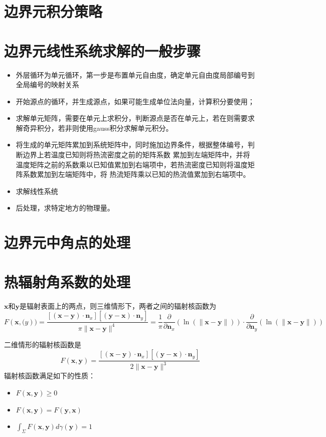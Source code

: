 \section{边界元积分策略}
\section{边界元线性系统求解的一般步骤}
\begin{itemize}
	\item 外层循环为单元循环，第一步是布置单元自由度，确定单元自由度局部编号到全局编号的映射关系
	\item 开始源点的循环，并生成源点，如果可能生成单位法向量，计算积分要使用；
	\item 求解单元矩阵，需要在单元上求积分，判断源点是否在单元上，若在则需要求解奇异积分，若非则使用gauss积分求解单元积分。
	\item 将生成的单元矩阵累加到系统矩阵中，同时施加边界条件，根据整体编号，判断边界上若温度已知则将热流密度之前的矩阵系数
		累加到左端矩阵中，并将温度矩阵之前的系数乘以已知值累加到右端项中，若热流密度已知则将温度矩阵系数累加到左端矩阵中，将
		热流矩阵乘以已知的热流值累加到右端项中。
	\item 求解线性系统
	\item 后处理，求特定地方的物理量。
\end{itemize}



\section{边界元中角点的处理}
\section{热辐射角系数的处理}
$\mathbf{x}$和$\mathbf{y}$是辐射表面上的两点，则三维情形下，两者之间的辐射核函数为
\begin{equation}
	F(\mathbf{x},\mathbf(y))=\frac{[(\mathbf{x}-\mathbf{y}) \cdot \mathbf{n}_x][(\mathbf{y}-\mathbf{x}) \cdot \mathbf{n}_y]}{\pi \|\mathbf{x}-\mathbf{y}\|^4}
	=\frac{1}{\pi} \frac{\partial}{\partial \mathbf{n}_x}(\ln (\|\mathbf{x}-\mathbf{y}\|)) \cdot \frac{\partial}{\partial \mathbf{n}_y}(\ln (\|\mathbf{x}-\mathbf{y}\|))
\end{equation}

二维情形的辐射核函数是
\begin{equation}
	F(\mathbf{x},\mathbf{y})=\frac{[(\mathbf{x}-\mathbf{y}) \cdot \mathbf{n}_x][(\mathbf{y}-\mathbf{x}) \cdot \mathbf{n}_y]}{2\|\mathbf{x}-\mathbf{y}\|^3}
\end{equation}
辐射核函数满足如下的性质：
\begin{itemize}
	\item $F(\mathbf{x},\mathbf{y}) \ge 0$
	\item $F(\mathbf{x},\mathbf{y})=F(\mathbf{y},\mathbf{x})$
	\item $\int_{\Sigma}F(\mathbf{x},\mathbf{y}) d \gamma(\mathbf{y}) = 1$
\end{itemize}

